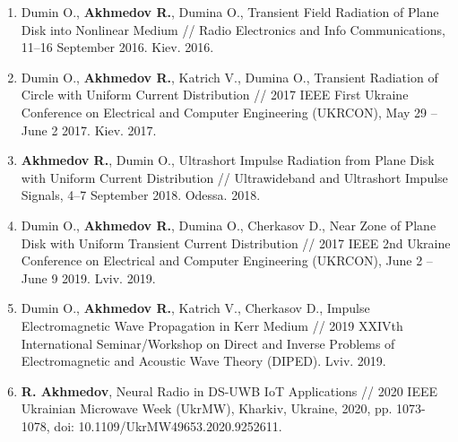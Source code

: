 {\begin{enumerate}
		\item Dumin O., \textbf{Akhmedov R.}, Dumina O., Transient Field 
		Radiation of Plane Disk into Nonlinear Medium // Radio Electronics and 
		Info Communications, 11--16 September 2016. Kiev. 2016.
		
		\item Dumin O., \textbf{Akhmedov R.}, Katrich V., Dumina O., Transient 
		Radiation of Circle with Uniform Current Distribution // 2017 IEEE First 
		Ukraine Conference on Electrical and Computer Engineering (UKRCON), 
		May 29 -- June 2 2017. Kiev. 2017.
		
		\item \textbf{Akhmedov R.}, Dumin O., Ultrashort Impulse Radiation from 
		Plane Disk with Uniform Current Distribution // Ultrawideband and 
		Ultrashort Impulse Signals, 4--7 September 2018. Odessa. 2018.
		
		\item Dumin O., \textbf{Akhmedov R.}, Dumina O., Cherkasov D., Near Zone 
		of Plane Disk with Uniform Transient Current Distribution // 2017 IEEE 2nd 
		Ukraine Conference on Electrical and Computer Engineering (UKRCON), 
		June 2 -- June 9 2019. Lviv. 2019.
		
		\item Dumin O., \textbf{Akhmedov R.}, Katrich V., Cherkasov D., 
		Impulse Electromagnetic Wave Propagation in Kerr Medium // 2019 XXIVth 
		International Seminar/Workshop on Direct and Inverse Problems of 
		Electromagnetic and Acoustic Wave Theory (DIPED). Lviv. 2019.
		
		\item  \textbf{R. Akhmedov}, Neural Radio in DS-UWB IoT Applications // 2020 
		IEEE Ukrainian Microwave Week (UkrMW), Kharkiv, Ukraine, 2020, pp. 1073-1078, 
		doi: 10.1109/UkrMW49653.2020.9252611.
		
		\setcounter{ItemsInMyWriting}{\value{enumi}}
	\end{enumerate}
	
}